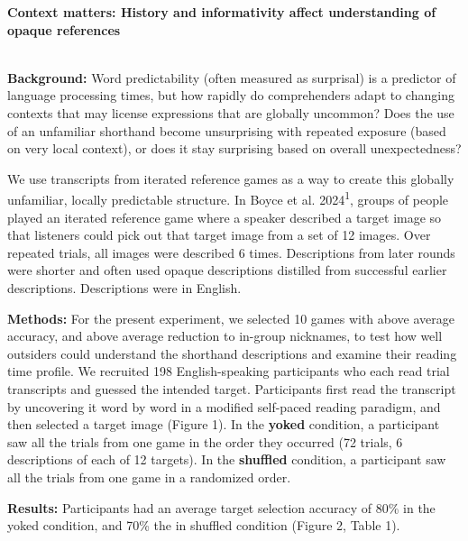 \documentclass[11pt,a4paper]{article}
\renewcommand{\title}[1]{\textbf{#1}\\}
\newcommand{\authors}[1]{\iftoggle{anonymous}{\phantom{#1}}{#1}\\}
\begin{document}
\noindent\title{Context matters: History and informativity affect understanding of opaque references}
\authors{Veronica Boyce (vboyce@stanford.edu), Ben Prystawski, Alvin Tan, Michael C. Frank \\Stanford University}
\newline

\noindent\textbf{Background:} Word predictability (often measured as surprisal) is a predictor of language processing times, but how rapidly do comprehenders adapt to changing contexts that may license expressions that are globally uncommon? Does the use of an unfamiliar shorthand become unsurprising with repeated exposure (based on very local context), or does it stay surprising based on overall unexpectedness? 

 We use transcripts from iterated reference games as a way to create this globally unfamiliar, locally predictable structure. In Boyce et al. 2024\textsuperscript{1}, groups of people played an iterated reference game where a speaker described a target image so that listeners could pick out that target image from a set of 12 images. Over repeated trials, all images were described 6 times. Descriptions from later rounds were shorter and often used opaque descriptions distilled from successful earlier descriptions. Descriptions were in English. 

\smallskip

\noindent \textbf{Methods:} For the present experiment, we selected 10 games with above average accuracy, and above average reduction to in-group nicknames, to test how well outsiders could understand the shorthand descriptions and examine their reading time profile. We recruited 198 English-speaking participants who each read trial transcripts and guessed the intended target. Participants first read the transcript by uncovering it word by word in a modified self-paced reading paradigm, and then selected a target image (Figure 1). In the \textbf{yoked} condition, a participant saw all the trials from one game in the order they occurred (72 trials, 6 descriptions of each of 12 targets). In the \textbf{shuffled} condition, a participant saw all the trials from one game in a randomized order.

\smallskip

\noindent \textbf{Results:} Participants had an average target selection accuracy of 80\% in the yoked condition, and 70\% the in shuffled condition (Figure 2, Table 1).
\end{document}

